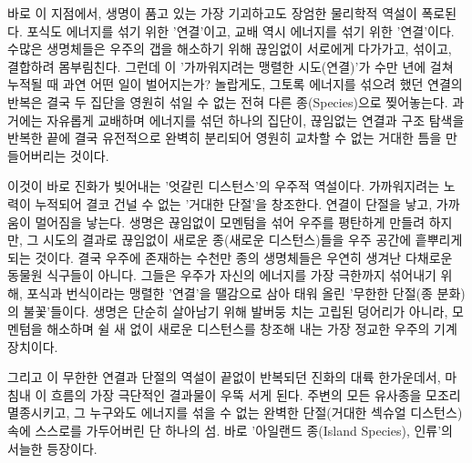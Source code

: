 바로 이 지점에서, 생명이 품고 있는 가장 기괴하고도 장엄한 물리학적 역설이 폭로된다.
포식도 에너지를 섞기 위한 '연결'이고, 교배 역시 에너지를 섞기 위한 '연결'이다. 수많은 생명체들은 우주의 갭을 해소하기 위해 끊임없이 서로에게 다가가고, 섞이고, 결합하려 몸부림친다. 그런데 이 '가까워지려는 맹렬한 시도(연결)'가 수만 년에 걸쳐 누적될 때 과연 어떤 일이 벌어지는가?
놀랍게도, 그토록 에너지를 섞으려 했던 연결의 반복은 결국 두 집단을 영원히 섞일 수 없는 전혀 다른 종(Species)으로 찢어놓는다. 과거에는 자유롭게 교배하며 에너지를 섞던 하나의 집단이, 끊임없는 연결과 구조 탐색을 반복한 끝에 결국 유전적으로 완벽히 분리되어 영원히 교차할 수 없는 거대한 틈을 만들어버리는 것이다.

이것이 바로 진화가 빚어내는 '엇갈린 디스턴스'의 우주적 역설이다. 가까워지려는 노력이 누적되어 결코 건널 수 없는 '거대한 단절'을 창조한다. 연결이 단절을 낳고, 가까움이 멀어짐을 낳는다. 생명은 끊임없이 모멘텀을 섞어 우주를 평탄하게 만들려 하지만, 그 시도의 결과로 끊임없이 새로운 종(새로운 디스턴스)들을 우주 공간에 흩뿌리게 되는 것이다.
결국 우주에 존재하는 수천만 종의 생명체들은 우연히 생겨난 다채로운 동물원 식구들이 아니다. 그들은 우주가 자신의 에너지를 가장 극한까지 섞어내기 위해, 포식과 번식이라는 맹렬한 '연결'을 땔감으로 삼아 태워 올린 '무한한 단절(종 분화)의 불꽃'들이다. 생명은 단순히 살아남기 위해 발버둥 치는 고립된 덩어리가 아니라, 모멘텀을 해소하며 쉴 새 없이 새로운 디스턴스를 창조해 내는 가장 정교한 우주의 기계장치이다.

그리고 이 무한한 연결과 단절의 역설이 끝없이 반복되던 진화의 대륙 한가운데서, 마침내 이 흐름의 가장 극단적인 결과물이 우뚝 서게 된다. 주변의 모든 유사종을 모조리 멸종시키고, 그 누구와도 에너지를 섞을 수 없는 완벽한 단절(거대한 섹슈얼 디스턴스) 속에 스스로를 가두어버린 단 하나의 섬. 바로 '아일랜드 종(Island Species), 인류'의 서늘한 등장이다.